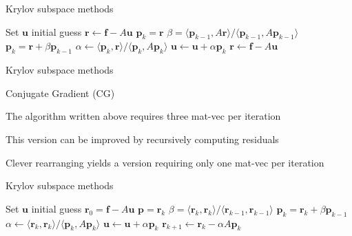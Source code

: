 \documentclass[18pt,xcolor=table]{beamer}
\begin{document}
\begin{frame}{Krylov subspace methods}
\begin{algorithm}[H]
\caption{Conjugate Gradient (CG) Version 1}
\begin{algorithmic}
\State Set $\mathbf{u}$ initial guess
\State $\mathbf{r} \leftarrow \mathbf{f} - A\mathbf{u}$
\State $\mathbf{p}_k = \mathbf{r}$
\Else
\State $\beta  = \langle \mathbf{p}_{k-1}, A\mathbf{r} \rangle / \langle \mathbf{p}_{k-1}, A\mathbf{p}_{k-1} \rangle$
\State $\mathbf{p}_k = \mathbf{r} + \beta \mathbf{p}_{k-1}$
\EndIf
\State $\alpha \leftarrow \langle \mathbf{p}_k, \mathbf{r} \rangle / \langle \mathbf{p}_k, A\mathbf{p}_k \rangle$
\State $\mathbf{u} \leftarrow \mathbf{u} + \alpha\mathbf{p}_k$
\State $\mathbf{r} \leftarrow \mathbf{f} - A\mathbf{u}$
\EndFor
\end{algorithmic}
\end{algorithm}
\end{frame}

\begin{frame}{Krylov subspace methods}
\begin{block}{Conjugate Gradient (CG)}
\bit
\item The algorithm written above requires three mat-vec per iteration
\item This version can be improved by recursively computing residuals
\item Clever rearranging yields a version requiring only one mat-vec per iteration
\eit
\end{block}
\end{frame}

\begin{frame}{Krylov subspace methods}
\begin{algorithm}[H]
\caption{Conjugate Gradient (CG) Version 2}
\begin{algorithmic}
\State Set $\mathbf{u}$ initial guess
\State $\mathbf{r}_0 = \mathbf{f} - A\mathbf{u}$
\State $\mathbf{p} = \mathbf{r}_k$
\Else
\State $\beta  = \langle \mathbf{r}_k, \mathbf{r}_k \rangle / \langle \mathbf{r}_{k-1}, \mathbf{r}_{k-1} \rangle$
\State $\mathbf{p}_k = \mathbf{r}_k + \beta \mathbf{p}_{k-1}$
\EndIf
\State $\alpha \leftarrow \langle \mathbf{r}_k, \mathbf{r}_k \rangle / \langle \mathbf{p}_k, A\mathbf{p}_k \rangle$
\State $\mathbf{u} \leftarrow \mathbf{u} + \alpha\mathbf{p}_k$
\State $\mathbf{r}_{k+1} \leftarrow \mathbf{r}_k - \alpha A\mathbf{p}_k$
\EndFor
\end{algorithmic}
\end{algorithm}
\end{frame}
\end{document}
